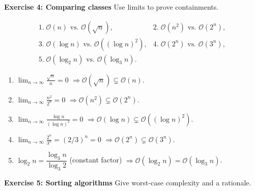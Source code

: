 \documentclass{article}
\theoremstyle{theorem}
\theoremstyle{definition}
\theoremstyle{remark}
\begin{document}
\bigskip
\textbf{Exercise 4: Comparing classes}
Use limits to prove containments.

\[
\begin{array}{ll}
1.\;\mathcal O(n)\text{ vs. }\mathcal O(\sqrt n),&
2.\;\mathcal O(n^{2})\text{ vs. }\mathcal O(2^{n}),\\[4pt]
3.\;\mathcal O(\log n)\text{ vs. }\mathcal O((\log n)^{2}),&
4.\;\mathcal O(2^{n})\text{ vs. }\mathcal O(3^{n}),\\[4pt]
5.\;\mathcal O(\log_{2}n)\text{ vs. }\mathcal O(\log_{3}n).
\end{array}
\]

\begin{enumerate}
  \item $\displaystyle\lim_{n\to\infty}\frac{\sqrt n}{n}=0$  
        $\Rightarrow\mathcal O(\sqrt n)\subsetneq\mathcal O(n)$.

  \item $\displaystyle\lim_{n\to\infty}\frac{n^{2}}{2^{n}}=0$  
        $\Rightarrow\mathcal O(n^{2})\subsetneq\mathcal O(2^{n})$.

  \item $\displaystyle\lim_{n\to\infty}\frac{\log n}{(\log n)^{2}}=0$  
        $\Rightarrow\mathcal O(\log n)\subsetneq\mathcal O((\log n)^{2})$.

  \item $\displaystyle\lim_{n\to\infty}\frac{2^{n}}{3^{n}}=(2/3)^{n}=0$  
        $\Rightarrow\mathcal O(2^{n})\subsetneq\mathcal O(3^{n})$.

  \item $\log_{2}n=\dfrac{\log_{3}n}{\log_{3}2}$ (constant factor)   
        $\Rightarrow\mathcal O(\log_{2}n)=\mathcal O(\log_{3}n)$.
\end{enumerate}

\bigskip
\textbf{Exercise 5: Sorting algorithms}
Give worst-case complexity and a rationale.
\end{document}
